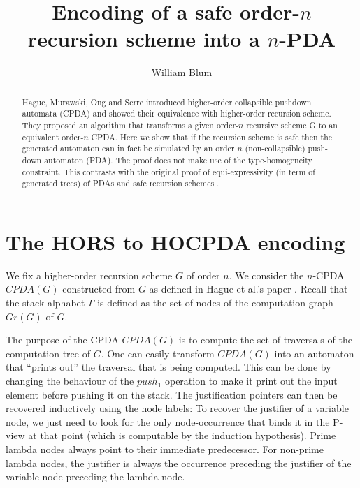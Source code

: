 \documentclass[a4paper]{article}
\author{William Blum}
\title{Encoding of a safe order-$n$ recursion scheme into a $n$-PDA}
\theoremstyle{remark}
\theoremstyle{definition}
\begin{document}
\maketitle
{}

\begin{abstract}
Hague, Murawski, Ong and Serre \cite{hmos-lics08} introduced
higher-order collapsible pushdown automata (CPDA) and showed their
equivalence with higher-order recursion scheme. They proposed an
algorithm that transforms a given order-$n$ recursive  scheme G to
an equivalent order-$n$ CPDA. Here we show that if the recursion
scheme is safe then the generated automaton can in fact be simulated by an order
$n$ (non-collapsible) push-down automaton (PDA). The proof does not make
use of the type-homogeneity constraint. This contrasts with the original proof
of equi-expressivity (in term of generated trees) of PDAs and safe recursion schemes \cite{KNU02}.
\end{abstract}




\section{The HORS to HOCPDA encoding}

We fix a higher-order recursion scheme $G$ of order $n$.
We consider the $n$-CPDA $CPDA(G)$ constructed from $G$ as defined in Hague et al.'s paper \cite[Definition 5.2]{hague-collaps-full}.
Recall that the stack-alphabet $\Gamma$ is defined as the set of nodes of the computation graph $Gr(G)$ of $G$.

The purpose of the CPDA $CPDA(G)$ is to compute the set of traversals of the computation tree of $G$. One can easily transform $CPDA(G)$ into an automaton that ``prints out'' the traversal that is being computed. This can be done by changing the behaviour of the $push_1$ operation to make it print out the input element before pushing it on the stack. The justification pointers can then be recovered inductively using the node labels: To recover the justifier of a variable node, we just need to look for the only node-occurrence that binds it in the P-view at that point (which is computable by the induction hypothesis).
Prime lambda nodes always point to their immediate predecessor. For non-prime lambda nodes, the justifier is always the occurrence preceding the justifier of the variable node preceding the lambda node.
\end{document}
